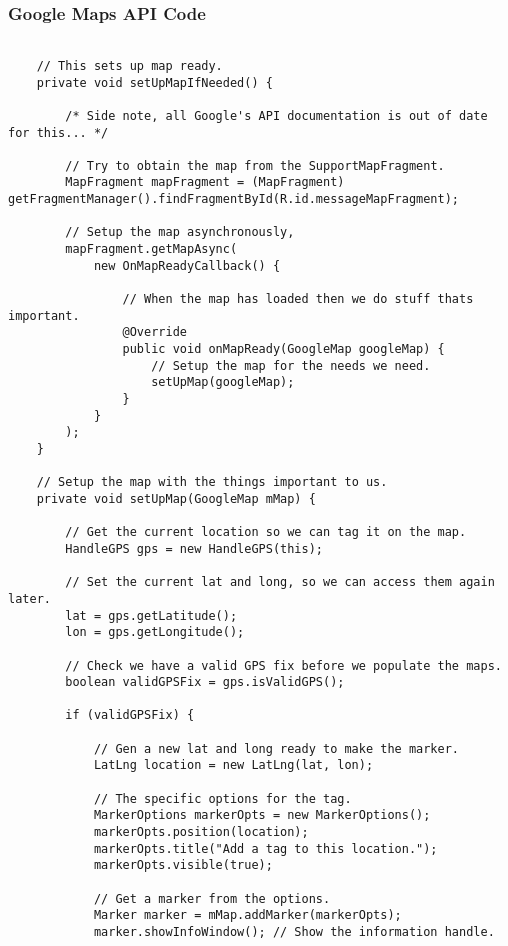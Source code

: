 \subsubsection*{Google Maps API Code}

\begin{lstlisting}

    // This sets up map ready.
    private void setUpMapIfNeeded() {

        /* Side note, all Google's API documentation is out of date for this... */

        // Try to obtain the map from the SupportMapFragment.
        MapFragment mapFragment = (MapFragment) getFragmentManager().findFragmentById(R.id.messageMapFragment);

        // Setup the map asynchronously,
        mapFragment.getMapAsync(
            new OnMapReadyCallback() {

                // When the map has loaded then we do stuff thats important.
                @Override
                public void onMapReady(GoogleMap googleMap) {
                    // Setup the map for the needs we need.
                    setUpMap(googleMap);
                }
            }
        );
    }

    // Setup the map with the things important to us.
    private void setUpMap(GoogleMap mMap) {

        // Get the current location so we can tag it on the map.
        HandleGPS gps = new HandleGPS(this);

        // Set the current lat and long, so we can access them again later.
        lat = gps.getLatitude();
        lon = gps.getLongitude();

        // Check we have a valid GPS fix before we populate the maps.
        boolean validGPSFix = gps.isValidGPS();

        if (validGPSFix) {

            // Gen a new lat and long ready to make the marker.
            LatLng location = new LatLng(lat, lon);

            // The specific options for the tag.
            MarkerOptions markerOpts = new MarkerOptions();
            markerOpts.position(location);
            markerOpts.title("Add a tag to this location.");
            markerOpts.visible(true);

            // Get a marker from the options.
            Marker marker = mMap.addMarker(markerOpts);
            marker.showInfoWindow(); // Show the information handle.


\end{lstlisting}

